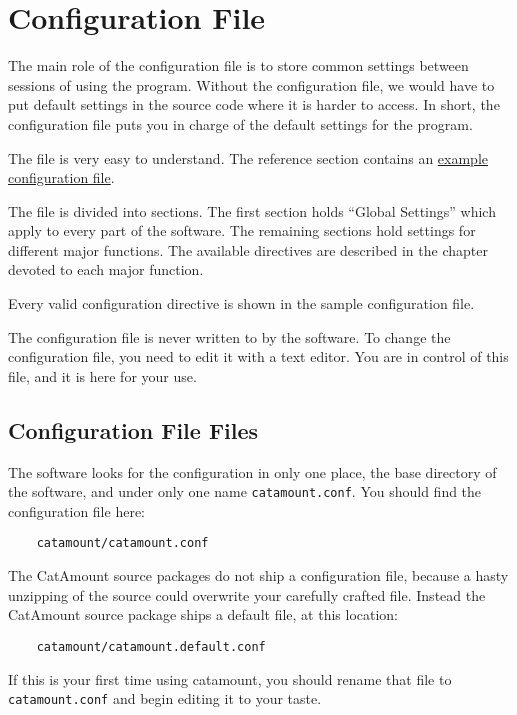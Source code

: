 \chapter{Configuration File}
\hypertarget{configuration-file}{}

The main role of the configuration file is to store common settings
between sessions of using the program. Without the configuration file,
we would have to put default settings in the source code where it is
harder to access. In short, the configuration file puts you in charge
of the default settings for the program.

The file is very easy to understand. The reference section contains an
\hyperlink{example-config}{example configuration file}.

The file is divided into sections. The first section holds ``Global
Settings'' which apply to every part of the software. The remaining
sections hold settings for different major functions. The available
directives are described in the chapter devoted to each major
function.

Every valid configuration directive is shown in the sample
configuration file.

The configuration file is never written to by the software. To change
the configuration file, you need to edit it with a text editor. You
are in control of this file, and it is here for your use.

\section{Configuration File Files}

The software looks for the configuration in only one place, the base
directory of the software, and under only one name
\texttt{catamount.conf}. You should find the configuration file here:

\begin{verbatim}
    catamount/catamount.conf
\end{verbatim}

The CatAmount source packages do not ship a configuration file,
because a hasty unzipping of the source could overwrite your carefully
crafted file. Instead the CatAmount source package ships a default
file, at this location:

\begin{verbatim}
    catamount/catamount.default.conf
\end{verbatim}

If this is your first time using catamount, you should rename that
file to \texttt{catamount.conf} and begin editing it to your taste.
